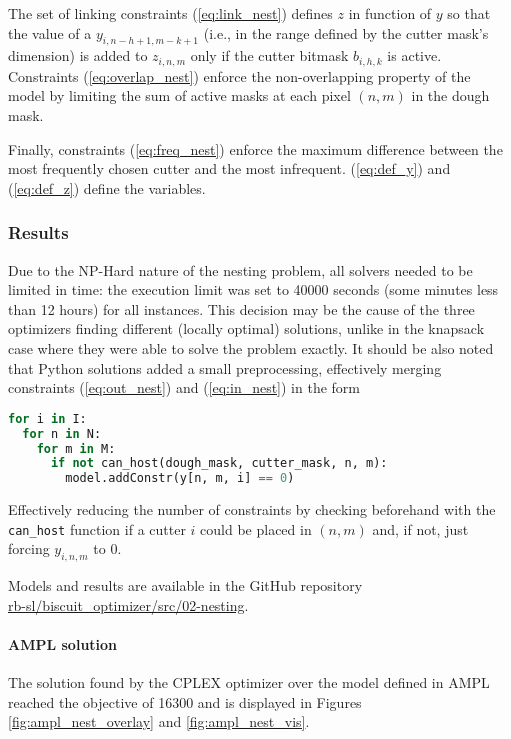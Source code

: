 The set of linking constraints (\ref{eq:link_nest}) defines $z$ in function of $y$ so that the value of a $y_{i, n-h+1, m-k+1}$ (i.e., in the range defined by the cutter mask's dimension) is added to $z_{i, n, m}$ only if the cutter bitmask $b_{i, h, k}$ is active. Constraints (\ref{eq:overlap_nest}) enforce the non-overlapping property of the model by limiting the sum of active masks at each pixel $(n, m)$ in the dough mask.

Finally, constraints (\ref{eq:freq_nest}) enforce the maximum difference between the most frequently chosen cutter and the most infrequent. (\ref{eq:def_y}) and (\ref{eq:def_z}) define the variables.

\subsubsection{Results}
Due to the NP-Hard nature of the nesting problem, all solvers needed to be limited in time: the execution limit was set to 40000 seconds (some minutes less than 12 hours) for all instances. This decision may be the cause of the three optimizers finding different (locally optimal) solutions, unlike in the knapsack case where they were able to solve the problem exactly. It should be also noted that Python solutions added a small preprocessing, effectively merging constraints (\ref{eq:out_nest}) and (\ref{eq:in_nest}) in the form
\begin{lstlisting}[language=Python]
for i in I:
  for n in N:
    for m in M:
      if not can_host(dough_mask, cutter_mask, n, m):
        model.addConstr(y[n, m, i] == 0)
\end{lstlisting}
Effectively reducing the number of constraints by checking beforehand with the \texttt{can\_host} function if a cutter $i$ could be placed in $(n, m)$ and, if not, just forcing $y_{i, n, m}$ to 0.

Models and results are available in the GitHub repository \\ \href{https://github.com/rb-sl/biscuit_optimizer/tree/main/src/02-nesting}{rb-sl/biscuit\_optimizer/src/02-nesting}.

\paragraph{AMPL solution}
The solution found by the CPLEX optimizer over the model defined in AMPL reached the objective of 16300 and is displayed in Figures \ref{fig:ampl_nest_overlay} and \ref{fig:ampl_nest_vis}.

